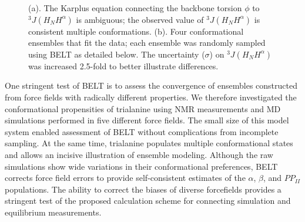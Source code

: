 \documentclass[journal=jacsat,manuscript=article]{achemso}
\begin{document}
\begin{figure}
\caption{
(a).  The Karplus equation connecting the backbone torsion $\phi$ to $^3J(H_NH^\alpha)$ is ambiguous; the observed value of $^3J(H_NH^\alpha)$ is consistent multiple conformations.  (b).  Four conformational ensembles that fit the data; each ensemble was randomly sampled using BELT as detailed below.  The uncertainty ($\sigma$) on $^3J(H_NH^\alpha)$ was increased 2.5-fold to better illustrate differences.
}
\label{figure:Ambiguity}

\end{figure}


One stringent test of BELT is to assess the convergence of ensembles constructed from force fields with radically different properties.  We therefore investigated the conformational propensities of trialanine using NMR measurements \cite{Graf2007} and MD simulations performed in five different force fields.  The small size of this model system enabled assessment of BELT without complications from incomplete sampling.  At the same time, trialanine populates multiple conformational states and allows an incisive illustration of ensemble modeling.  Although the raw simulations show wide variations in their conformational preferences, BELT corrects force field errors to provide self-consistent estimates of the $\alpha$, $\beta$, and $PP_{II}$ populations.  The ability to correct the biases of diverse forcefields provides a stringent test of the proposed calculation scheme for connecting simulation and equilibrium measurements. 
\end{document}
